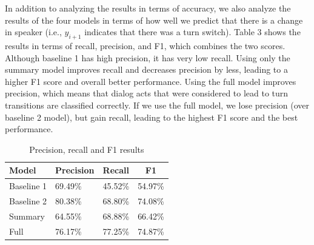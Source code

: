 In addition to analyzing the results in terms of accuracy, we also analyze the results of the four models in terms of how well we predict that there is a change in speaker (i.e., $y_{i+1}$  indicates that there was a turn switch).  Table 3 shows the results in terms of recall, precision, and F1, which combines the two scores.  Although baseline 1 has high precision, it has very low recall. Using only the summary model improves recall and decreases precision by less,
leading to a higher F1 score and overall better performance. Using the full model improves precision, which means that dialog acts
that were considered to lead to turn transitions are classified correctly. If we use the full model, we lose precision (over baseline 2 model), but gain recall,
leading to the highest F1 score and the best performance.
%
\begin{table}[ht!]
\scriptsize
   \begin{center}
    \begin{tabular}{|l|l|l|c|}
    \hline
    Model & Precision & Recall & F1\\
    \hline
    Baseline 1               &69.49\% &45.52\%&54.97\%\\
    Baseline 2               &80.38\% &68.80\%&74.08\%\\
    Summary                  &64.55\% &68.88\%&66.42\%\\
    Full                     &76.17\% &77.25\%&74.87\%\\
  \hline
\end{tabular}
\end{center}\vspace{-0.8em}
\caption{Precision, recall and F1 results }
\end{table}

